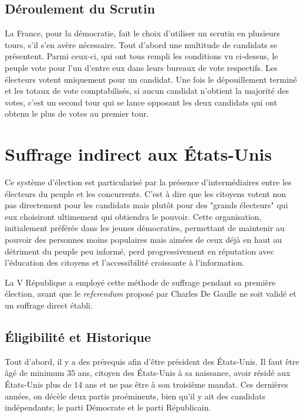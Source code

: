 \documentclass[12pt,a4paper]{report}
\begin{document}
\subsection{Déroulement du Scrutin}

La France, pour la démocratie, fait le choix d'utiliser un scrutin en plusieurs tours, s'il s'en avère nécessaire.
Tout d’abord une multitude de candidats se présentent.
Parmi ceux-ci, qui ont tous rempli les conditions vu ci-dessus, le peuple vote pour l’un d’entre eux dans leurs bureaux de vote respectifs.
Les électeurs votent uniquement pour un candidat.
Une fois le dépouillement terminé et les totaux de vote comptabilisés, si aucun candidat n’obtient la majorité des votes, c’est un second tour qui se lance opposant les deux candidats qui ont obtenu le plus de votes au premier tour.

\section{Suffrage indirect aux États-Unis}

Ce système d'élection est particularisé par la présence d'intermédiaires entre les électeurs du peuple et les concurrents. 
C'est à dire que les citoyens votent non pas directement pour les candidats mais plutôt pour des "grands électeurs" qui eux choisiront ultimement qui obtiendra le pouvoir.
Cette organisation, initialement préférée dans les jeunes démocraties, permettant de maintenir au pouvoir des personnes moins populaires mais aimées de ceux déjà en haut au détriment du peuple peu informé, perd progressivement en réputation avec l'éducation des citoyens et l'accessibilité croissante à l'information.
\nocite{wiki:scrutinindir}

La V République a employé cette méthode de suffrage pendant sa première élection, avant que le \textit{referendum} proposé par Charles De Gaulle ne soit validé et un suffrage direct établi. \nocite{polmania:scrutins}

\subsection{Éligibilité et Historique}

Tout d’abord, il y a des prérequis afin d’être président des États-Unis.
Il faut être âgé de minimum 35 ans, citoyen des États-Unis à sa naissance, avoir résidé aux États-Unis plus de 14 ans et ne pas être à son troisième mandat.
Ces dernières années, on décèle deux partis proéminents, bien qu'il y ait des candidats indépendants; le parti Démocrate et le parti Républicain.
\end{document}
